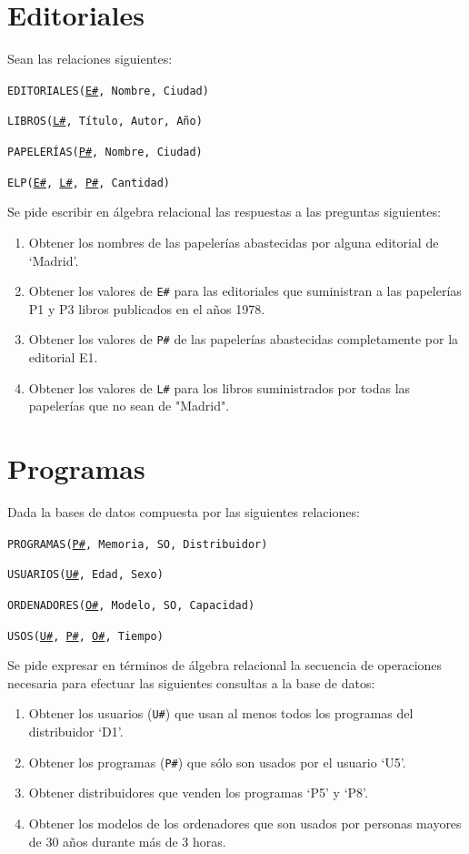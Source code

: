 \documentclass[a4paper]{article}
\begin{document}
\section{Editoriales}

Sean las relaciones siguientes:

\texttt{EDITORIALES(\underline{E\#}, Nombre, Ciudad)}

\texttt{LIBROS(\underline{L\#}, Título, Autor, Año)}

\texttt{PAPELERÍAS(\underline{P\#}, Nombre, Ciudad)}

\texttt{ELP(\underline{E\#}, \underline{L\#}, \underline{P\#}, Cantidad)}

Se pide escribir en álgebra relacional las respuestas a las preguntas siguientes:

\begin{enumerate}
    \item Obtener los nombres de las papelerías abastecidas por alguna editorial de `Madrid'.
    \item Obtener los valores de \texttt{E\#} para las editoriales que suministran a las papelerías P1 y P3 libros publicados en el años 1978.
    \item Obtener los valores de \texttt{P\#} de las papelerías abastecidas completamente por la editorial E1.
    \item Obtener los valores de \texttt{L\#} para los libros suministrados por todas las papelerías que no sean de "Madrid".
\end{enumerate}

\section{Programas}

Dada la bases de datos compuesta por las siguientes relaciones:

\texttt{PROGRAMAS(\underline{P\#}, Memoria, SO, Distribuidor)}

\texttt{USUARIOS(\underline{U\#}, Edad, Sexo)}

\texttt{ORDENADORES(\underline{O\#}, Modelo, SO, Capacidad)}

\texttt{USOS(\underline{U\#}, \underline{P\#}, \underline{O\#}, Tiempo)}

Se pide expresar en términos de álgebra relacional la secuencia de operaciones necesaria para efectuar las siguientes consultas a la base de datos:

\begin{enumerate}
    \item Obtener los usuarios (\texttt{U\#}) que usan al menos todos los programas del distribuidor `D1'.
    \item Obtener los programas (\texttt{P\#}) que sólo son usados por el usuario `U5'.
    \item Obtener distribuidores que venden los programas `P5' y `P8'.
    \item Obtener los modelos de los ordenadores que son usados por personas mayores de 30 años durante más de 3 horas.
\end{enumerate}
\end{document}
